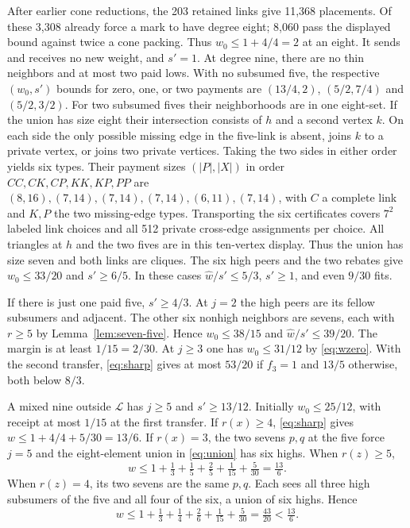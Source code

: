 \documentclass[11pt,a4paper]{amsart}
\newcommand{\LL}{\mathcal L}
\newcommand{\wt}{\widehat w}
\begin{document}
After earlier cone reductions, the 203 retained links give 11,368
placements. Of these 3,308 already force a mark to have degree
eight; 8,060 pass the displayed bound against twice a cone packing.
Thus $w_0\le1+4/4=2$ at an eight. It sends and receives no new
weight, and $s'=1$. At degree nine,
there are no thin neighbors and at most two paid lows. With no
subsumed five, the respective $(w_0,s')$ bounds for zero, one,
or two payments are $(13/4,2)$, $(5/2,7/4)$ and $(5/2,3/2)$.
For two subsumed fives their neighborhoods are in one eight-set.
If the union has size eight their intersection consists of $h$
and a second vertex $k$. On each side the only possible missing
edge in the five-link is absent, joins $k$ to a private vertex,
or joins two private vertices. Taking the two sides in either
order yields six types. Their payment sizes $(|P|,|X|)$ in
order $CC,CK,CP,KK,KP,PP$ are
$(8,16),(7,14),(7,14),(7,14),(6,11),(7,14)$, with $C$ a
complete link and $K,P$ the two missing-edge types. Transporting
the six certificates covers $7^2$ labeled link choices and all
512 private cross-edge assignments per choice. All triangles
at $h$ and the two fives are in this ten-vertex display.
Thus the union has size seven and both links are cliques. The six high peers
and the two rebates give $w_0\le33/20$ and $s'\ge6/5$.
In these cases $\wt/s'\le5/3$, $s'\ge1$, and even $9/30$ fits.

If there is just one paid five, $s'\ge4/3$. At $j=2$ the high
peers are its fellow subsumers and adjacent. The other six
nonhigh neighbors are sevens, each with $r\ge5$ by
Lemma~\ref{lem:seven-five}. Hence $w_0\le38/15$ and
$\wt/s'\le39/20$. The margin is at least $1/15=2/30$.
At $j\ge3$ one has $w_0\le31/12$ by \eqref{eq:wzero}.
With the second transfer, \eqref{eq:sharp} gives at most $53/20$
if $f_3=1$ and $13/5$ otherwise, both below $8/3$.

A mixed nine outside $\LL$ has $j\ge5$ and $s'\ge13/12$.
Initially $w_0\le25/12$, with receipt at most $1/15$ at the
first transfer. If $r(x)\ge4$, \eqref{eq:sharp} gives
$w\le1+4/4+5/30=13/6$. If $r(x)=3$, the two sevens $p,q$
at the five force $j=5$ and the eight-element union in
\eqref{eq:union} has six highs. When $r(z)\ge5$,
\[
 w\le 1+\tfrac13+\tfrac15+\tfrac25+\tfrac1{15}
               +\tfrac5{30}=\tfrac{13}{6}.
\]
When $r(z)=4$, its two sevens are the same $p,q$. Each sees all
three high subsumers of the five and all four of the six, a union
of six highs. Hence
\[
 w\le 1+\tfrac13+\tfrac14+\tfrac26+\tfrac1{15}
               +\tfrac5{30}=\tfrac{43}{20}<\tfrac{13}{6}.
\]
\end{document}
